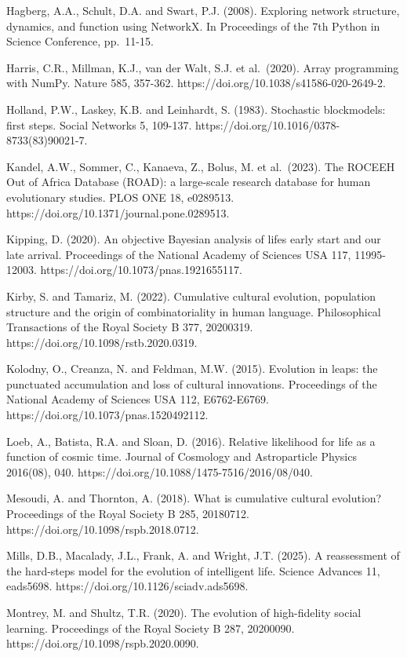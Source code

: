 \documentclass[
  10pt,a4paper,
]{article}
\begin{document}
Hagberg, A.A., Schult, D.A. and Swart, P.J. (2008). Exploring network
structure, dynamics, and function using NetworkX. In Proceedings of the
7th Python in Science Conference, pp.~11-15.

Harris, C.R., Millman, K.J., van der Walt, S.J. et al.~(2020). Array
programming with NumPy. Nature 585, 357-362.
https://doi.org/10.1038/s41586-020-2649-2.

Holland, P.W., Laskey, K.B. and Leinhardt, S. (1983). Stochastic
blockmodels: first steps. Social Networks 5, 109-137.
https://doi.org/10.1016/0378-8733(83)90021-7.

Kandel, A.W., Sommer, C., Kanaeva, Z., Bolus, M. et al.~(2023). The
ROCEEH Out of Africa Database (ROAD): a large-scale research database
for human evolutionary studies. PLOS ONE 18, e0289513.
https://doi.org/10.1371/journal.pone.0289513.

Kipping, D. (2020). An objective Bayesian analysis of
life\textquotesingle s early start and our late arrival. Proceedings of
the National Academy of Sciences USA 117, 11995-12003.
https://doi.org/10.1073/pnas.1921655117.

Kirby, S. and Tamariz, M. (2022). Cumulative cultural evolution,
population structure and the origin of combinatoriality in human
language. Philosophical Transactions of the Royal Society B 377,
20200319. https://doi.org/10.1098/rstb.2020.0319.

Kolodny, O., Creanza, N. and Feldman, M.W. (2015). Evolution in leaps:
the punctuated accumulation and loss of cultural innovations.
Proceedings of the National Academy of Sciences USA 112, E6762-E6769.
https://doi.org/10.1073/pnas.1520492112.

Loeb, A., Batista, R.A. and Sloan, D. (2016). Relative likelihood for
life as a function of cosmic time. Journal of Cosmology and
Astroparticle Physics 2016(08), 040.
https://doi.org/10.1088/1475-7516/2016/08/040.

Mesoudi, A. and Thornton, A. (2018). What is cumulative cultural
evolution? Proceedings of the Royal Society B 285, 20180712.
https://doi.org/10.1098/rspb.2018.0712.

Mills, D.B., Macalady, J.L., Frank, A. and Wright, J.T. (2025). A
reassessment of the hard-steps model for the evolution of intelligent
life. Science Advances 11, eads5698.
https://doi.org/10.1126/sciadv.ads5698.

Montrey, M. and Shultz, T.R. (2020). The evolution of high-fidelity
social learning. Proceedings of the Royal Society B 287, 20200090.
https://doi.org/10.1098/rspb.2020.0090.
\end{document}
